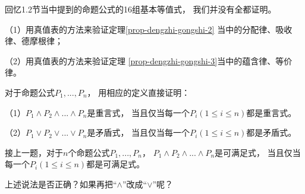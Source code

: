 \vs

\begin{prob}[一般的多元连接词]

\end{prob}\vs

\begin{prob}[合取范式与析取范式]

\end{prob}\vs

\begin{prob}[完备连接词组]

\end{prob}\vs

\begin{prob}[基本等值公式的验证]
回忆1.2节当中提到的命题公式的16组基本等值式，
我们并没有全都证明。

（1）用真值表的方法来验证定理\ref{prop-dengzhi-gongshi-2}
当中的分配律、吸收律、德摩根律；

（2）用真值表的方法来验证定理
\ref{prop-dengzhi-gongshi-3}当中的蕴含律、等价律。
\end{prob}\vs

\begin{prob}对于命题公式$P_1,...,P_n$，
用相应的定义直接证明：

（1）$P_1\wedge P_2\wedge...\wedge P_n$是重言式，
当且仅当每一个$P_i(1\leq i\leq n)$都是重言式。

（2）$P_1\vee P_2\vee...\vee P_n$是矛盾式，
当且仅当每一个$P_i(1\leq i\leq n)$都是矛盾式。
\end{prob}\vs

\begin{prob}接上一题，对于$n$个命题公式$P_1,...,P_n$，
$P_1\wedge P_2\wedge...\wedge P_n$是可满足式，
当且仅当每一个$P_i(1\leq i\leq n)$都是可满足式。

上述说法是否正确？如果再把“$\wedge$”改成“$\vee$”呢？
\end{prob}\vs

